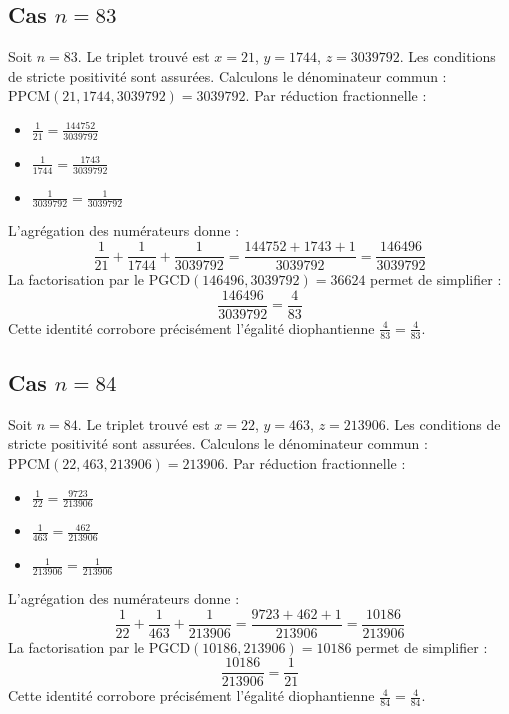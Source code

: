 \documentclass[11pt,a4paper]{article}
\begin{document}
\subsection{Cas $n = 83$}
Soit $n = 83$. Le triplet trouvé est $x = 21$, $y = 1744$, $z = 3039792$.
Les conditions de stricte positivité sont assurées.
Calculons le dénominateur commun : $\text{PPCM}(21, 1744, 3039792) = 3039792$.
Par réduction fractionnelle :
\begin{itemize}
    \item $\frac{1}{21} = \frac{144752}{3039792}$
    \item $\frac{1}{1744} = \frac{1743}{3039792}$
    \item $\frac{1}{3039792} = \frac{1}{3039792}$
\end{itemize}
L'agrégation des numérateurs donne :
$$ \frac{1}{21} + \frac{1}{1744} + \frac{1}{3039792} = \frac{144752 + 1743 + 1}{3039792} = \frac{146496}{3039792} $$
La factorisation par le $\text{PGCD}(146496, 3039792) = 36624$ permet de simplifier :
$$ \frac{146496}{3039792} = \frac{4}{83} $$
Cette identité corrobore précisément l'égalité diophantienne $\frac{4}{83} = \frac{4}{83}$.

\subsection{Cas $n = 84$}
Soit $n = 84$. Le triplet trouvé est $x = 22$, $y = 463$, $z = 213906$.
Les conditions de stricte positivité sont assurées.
Calculons le dénominateur commun : $\text{PPCM}(22, 463, 213906) = 213906$.
Par réduction fractionnelle :
\begin{itemize}
    \item $\frac{1}{22} = \frac{9723}{213906}$
    \item $\frac{1}{463} = \frac{462}{213906}$
    \item $\frac{1}{213906} = \frac{1}{213906}$
\end{itemize}
L'agrégation des numérateurs donne :
$$ \frac{1}{22} + \frac{1}{463} + \frac{1}{213906} = \frac{9723 + 462 + 1}{213906} = \frac{10186}{213906} $$
La factorisation par le $\text{PGCD}(10186, 213906) = 10186$ permet de simplifier :
$$ \frac{10186}{213906} = \frac{1}{21} $$
Cette identité corrobore précisément l'égalité diophantienne $\frac{4}{84} = \frac{4}{84}$.
\end{document}
